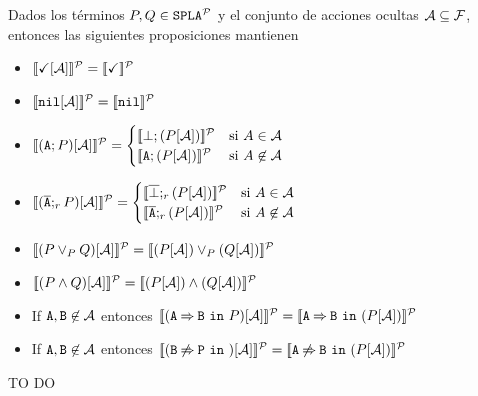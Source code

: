 \bprop
  Dados los términos $P,Q\in\mathtt{SPLA{^{\cal P}}}$ y el conjunto de acciones ocultas ${\cal A}\subseteq{\cal F}$, entonces
  las siguientes proposiciones mantienen
  \begin{itemize}
  \item $[\![\checkmark[{\cal A}]]\!]^{\cal P}=[\![\checkmark]\!]^{\cal P}$
  \item $[\![\mathtt{nil}[{\cal A}]]\!]^{\cal P}=[\![\mathtt{nil}]\!]^{\cal P}$
  \item
      $\semdenp{(\fA;P)\hide\calA}=
      \begin{cases}
        \semdenp{\bot;(P\hide\calA)} & \mbox{si } A\in\calA\\
        \semdenp{\fA;(P\hide\calA)} & \mbox{si } A\not\in\calA\\
      \end{cases}$
  \item
      $\semdenp{(\ofA;_rP)\hide\calA}=
      \begin{cases}
        \semdenp{\overline{\bot};_r(P\hide\calA)} & \mbox{si } A\in\calA\\
        \semdenp{\ofA;_r(P\hide\calA)} & \mbox{si } A\not\in\calA\\
      \end{cases}$
  \item $[\![(P\mathbin{\lor}_P Q)[{\cal A}]]\!]^{\cal P}=[\![(P[{\cal A}])\mathbin{\lor}_P (Q[{\cal A}])]\!]^{\cal P}$
  \item $[\![(P\mathbin{\wedge} Q)[{\cal A}]]\!]^{\cal P}=[\![(P[{\cal A}])\mathbin{\wedge} (Q[{\cal A}])]\!]^{\cal P}$
  \item If ${\mathtt{A}},{\mathtt{B}}\not\in{\cal A}$ entonces 
    $[\![(\mathtt{A}\mathbin{\Rightarrow}\mathtt{B}\ \mathtt{in}\ P)[{\cal A}]]\!]^{\cal P}=[\![\mathtt{A}\mathbin{\Rightarrow}\mathtt{B}\ \mathtt{in}\ (P[{\cal A}])]\!]^{\cal P}$
  \item If ${\mathtt{A}},{\mathtt{B}}\not\in{\cal A}$ entonces 
    $[\![(\mathtt{B}\mathbin{\not\Rightarrow}\mathtt{P}\ \mathtt{in}\ )[{\cal A}]]\!]^{\cal P}=[\![\mathtt{A}\mathbin{\not\Rightarrow}\mathtt{B}\ \mathtt{in}\ (P[{\cal A}])]\!]^{\cal P}$
  \end{itemize}
  \bprf
    TO DO 
  \eprf
\eprop

